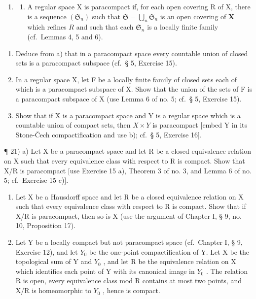 \begin{enumerate}
\def\labelenumi{\arabic{enumi})}
\setcounter{enumi}{19}
\tightlist
\item
  \begin{enumerate}
  \def\labelenumii{\alph{enumii})}
  \tightlist
  \item
    A regular space X is paracompact if, for each open covering R of X, there is a sequence \((\mathfrak{S}_{n})\) such that \(\mathfrak{S} = \bigcup_{n} \mathfrak{S}_{n}\) is an open covering of \(\mathbf{X}\) which refines \(R\) and such that each \(\mathfrak{S}_n\) is a locally finite family (cf.~Lemmas 4, 5 and 6).
  \end{enumerate}
\end{enumerate}

\begin{enumerate}
\def\labelenumi{\alph{enumi})}
\setcounter{enumi}{1}
\item
  Deduce from a) that in a paracompact space every countable union of closed sets is a paracompact subspace (cf.~§ 5, Exercise 15).
\item
  In a regular space X, let F be a locally finite family of closed sets each of which is a paracompact subspace of X. Show that the union of the sets of F is a paracompact subspace of X (use Lemma 6 of no. 5; cf.~§ 5, Exercise 15).
\item
  Show that if X is a paracompact space and Y is a regular space which is a countable union of compact sets, then \(X \times Y\) is paracompact {[}embed Y in its Stone-Čech compactification and use b); cf.~§ 5, Exercise 16{]}.
\end{enumerate}

¶ 21) a) Let X be a paracompact space and let R be a closed equivalence relation on X such that every equivalence class with respect to R is compact. Show that X/R is paracompact {[}use Exercise 15 a), Theorem 3 of no. 3, and Lemma 6 of no. 5; cf.~Exercise 15 c){]}.

\begin{enumerate}
\def\labelenumi{\alph{enumi})}
\setcounter{enumi}{1}
\item
  Let X be a Hausdorff space and let R be a closed equivalence relation on X such that every equivalence class with respect to R is compact. Show that if X/R is paracompact, then so is X (use the argument of Chapter I, § 9, no. 10, Proposition 17).
\item
  Let Y be a locally compact but not paracompact space (cf.~Chapter I, § 9, Exercise 12), and let \(Y_{0}\) be the one-point compactification of Y. Let X be the topological sum of Y and \(Y_{0}\) , and let R be the equivalence relation on X which identifies each point of Y with its canonical image in \(Y_{0}\) . The relation R is open, every equivalence class mod R contains at most two points, and X/R is homeomorphic to \(Y_{0}\) , hence is compact.
\end{enumerate}

